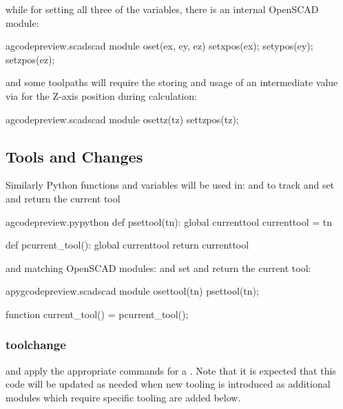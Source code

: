 \documentclass{ltxdoc}
\begin{document}
\noindent{} while for setting all three of the variables, there is
an internal OpenSCAD module:

\lstset{firstnumber=\thegcpscad}
\begin{writecode}{a}{gcodepreview.scad}{scad}
module oset(ex, ey, ez) {
    setxpos(ex);
    setypos(ey);
    setzpos(ez);
}

\end{writecode}
\addtocounter{gcpscad}{6}
 
\noindent and some toolpaths will require the storing and usage of an intermediate value via
 for the Z-axis position during calculation:

\lstset{firstnumber=\thegcpscad}
\begin{writecode}{a}{gcodepreview.scad}{scad}
module osettz(tz) {
    settzpos(tz);
}

\end{writecode}
\addtocounter{gcpscad}{4}

\subsection{Tools and Changes}
 
Similarly Python functions and variables will be used in:  and
 to track and set and return the current tool
 
\lstset{firstnumber=\thegcpy}
\begin{writecode}{a}{gcodepreview.py}{python}
def psettool(tn):
    global currenttool
    currenttool = tn

def pcurrent_tool():
    global currenttool
    return currenttool

\end{writecode}
\addtocounter{gcpy}{8}
 
\noindent and matching OpenSCAD modules:
 and
set and return the current tool: 
  
\lstset{firstnumber=\thepyscad}
\begin{writecode}{a}{pygcodepreview.scad}{scad}
module osettool(tn){
    psettool(tn);
}

function current_tool() = pcurrent_tool();

\end{writecode}
\addtocounter{pyscad}{6}

\subsubsection{toolchange}
\noindent and apply the appropriate commands for a \label{subsubsec:toolchange}
. Note that it is expected that this code will be updated as needed 
when new tooling is introduced as additional modules which require specific tooling are added below. 
\end{document}
